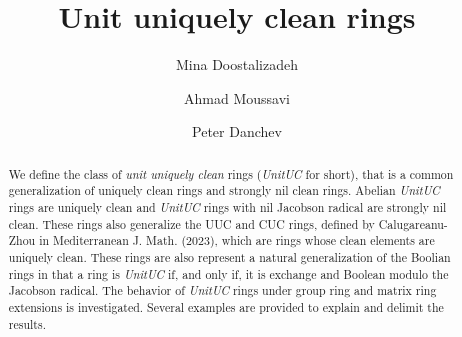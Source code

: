 \documentclass[12pt]{amsart}
\theoremstyle{definition}
\begin{document}
	
\author[M. Doostalizadeh]{Mina Doostalizadeh}
\address{Department of Mathematics, Tarbiat Modares University, 14115-111 Tehran Jalal AleAhmad Nasr, Iran}
 
\author[A. Moussavi]{Ahmad Moussavi}
\address{Department of Mathematics, Tarbiat Modares University, 14115-111 Tehran Jalal AleAhmad Nasr, Iran}
\author[P. Danchev]{Peter  Danchev}
\address{Institute of Mathematics and Informatics, Bulgarian Academy of Sciences, 1113
Sofia, Bulgaria}
 
\title[Unit uniquely clean rings]{Unit uniquely clean rings}

\maketitle
  
\begin{abstract}
We define the class of {\it unit uniquely clean} rings ({\it UnitUC} for short), that is a  common generalization of  uniquely clean rings and strongly nil clean rings. Abelian {\it UnitUC} rings are uniquely clean and {\it UnitUC} rings with nil Jacobson radical are strongly nil clean. These rings also generalize the UUC and CUC rings, defined by Calugareanu-Zhou in Mediterranean J. Math. (2023), which are rings whose clean elements are uniquely clean. These rings are also represent a natural generalization of the Boolian rings in that a ring is {\it UnitUC} if, and only if, it is exchange and Boolean modulo the Jacobson radical.  The behavior of {\it UnitUC} rings under group ring and matrix ring extensions
is investigated. Several examples are provided to explain and delimit the results.
\end{abstract}
\end{document}
